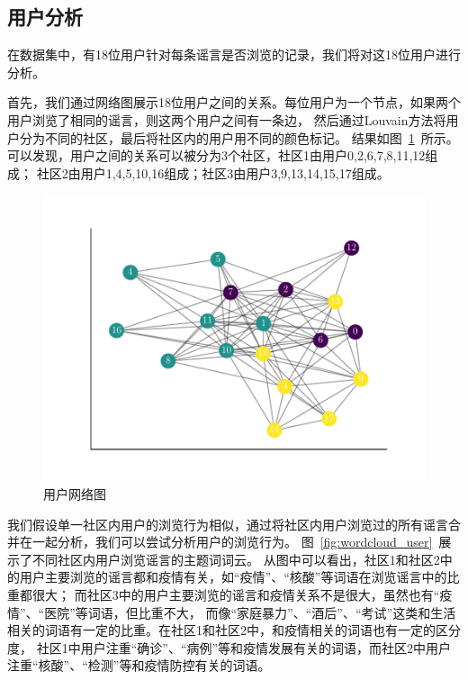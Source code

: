 \documentclass[UTF8]{ctexart}
\begin{document}
\subsection{用户分析}

在数据集中，有18位用户针对每条谣言是否浏览的记录，我们将对这18位用户进行分析。

首先，我们通过网络图展示18位用户之间的关系。每位用户为一个节点，如果两个用户浏览了相同的谣言，则这两个用户之间有一条边，
然后通过Louvain方法将用户分为不同的社区，最后将社区内的用户用不同的颜色标记。
结果如图~\ref{fig:user_network}~所示。可以发现，用户之间的关系可以被分为3个社区，社区1由用户0,2,6,7,8,11,12组成；
社区2由用户1,4,5,10,16组成；社区3由用户3,9,13,14,15,17组成。

\begin{figure}[!ht]
    \centering
    \includegraphics[width=0.6\linewidth]{../figures/user_network}
    \caption{用户网络图}
    \label{fig:user_network}
\end{figure}

我们假设单一社区内用户的浏览行为相似，通过将社区内用户浏览过的所有谣言合并在一起分析，我们可以尝试分析用户的浏览行为。
图~\ref{fig:wordcloud_user}~展示了不同社区内用户浏览谣言的主题词词云。
从图中可以看出，社区1和社区2中的用户主要浏览的谣言都和疫情有关，如“疫情”、“核酸”等词语在浏览谣言中的比重都很大；
而社区3中的用户主要浏览的谣言和疫情关系不是很大，虽然也有“疫情”、“医院”等词语，但比重不大，
而像“家庭暴力”、“酒后”、“考试”这类和生活相关的词语有一定的比重。在社区1和社区2中，和疫情相关的词语也有一定的区分度，
社区1中用户注重“确诊”、“病例”等和疫情发展有关的词语，而社区2中用户注重“核酸”、“检测”等和疫情防控有关的词语。
\end{document}
